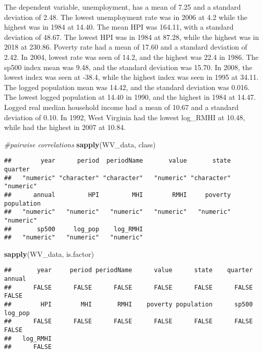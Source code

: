 \documentclass[
]{article}
\newenvironment{Shaded}{\begin{snugshade}}{\end{snugshade}}
\newcommand{\CommentTok}[1]{\textcolor[rgb]{0.56,0.35,0.01}{\textit{#1}}}
\newcommand{\KeywordTok}[1]{\textcolor[rgb]{0.13,0.29,0.53}{\textbf{#1}}}
\newcommand{\NormalTok}[1]{#1}
\begin{document}
The dependent variable, unemployment, has a mean of 7.25 and a standard
deviation of 2.48. The lowest unemployment rate was in 2006 at 4.2 while
the highest was in 1984 at 14.40. The mean HPI was 164.11, with a
standard deviation of 48.67. The lowest HPI was in 1984 at 87.28, while
the highest was in 2018 at 230.86. Poverty rate had a mean of 17.60 and
a standard deviation of 2.42. In 2004, lowest rate was seen of 14.2, and
the highest was 22.4 in 1986. The sp500 index mean was 9.48, and the
standard deviation was 15.70. In 2008, the lowest index was seen at
-38.4, while the highest index was seen in 1995 at 34.11. The logged
population mean was 14.42, and the standard deviation was 0.016. The
lowest logged population at 14.40 in 1990, and the highest in 1984 at
14.47. Logged real median household income had a mean of 10.67 and a
standard deviation of 0.10. In 1992, West Virginia had the lowest
log\_RMHI at 10.48, while had the highest in 2007 at 10.84.

\begin{Shaded}
\begin{Highlighting}[]
\CommentTok{#pairwise correlations}
\KeywordTok{sapply}\NormalTok{(WV_data, class)}
\end{Highlighting}
\end{Shaded}

\begin{verbatim}
##        year      period  periodName       value       state     quarter 
##   "numeric" "character" "character"   "numeric" "character"   "numeric" 
##      annual         HPI         MHI        RMHI     poverty  population 
##   "numeric"   "numeric"   "numeric"   "numeric"   "numeric"   "numeric" 
##       sp500     log_pop    log_RMHI 
##   "numeric"   "numeric"   "numeric"
\end{verbatim}

\begin{Shaded}
\begin{Highlighting}[]
\KeywordTok{sapply}\NormalTok{(WV_data, is.factor)}
\end{Highlighting}
\end{Shaded}

\begin{verbatim}
##       year     period periodName      value      state    quarter     annual 
##      FALSE      FALSE      FALSE      FALSE      FALSE      FALSE      FALSE 
##        HPI        MHI       RMHI    poverty population      sp500    log_pop 
##      FALSE      FALSE      FALSE      FALSE      FALSE      FALSE      FALSE 
##   log_RMHI 
##      FALSE
\end{verbatim}
\end{document}
